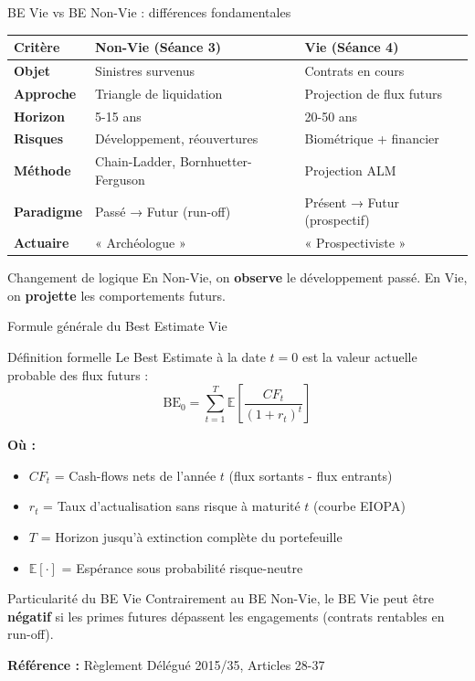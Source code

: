 \documentclass[10pt,aspectratio=169]{beamer}
\newcommand{\highlight}[1]{\textbf{\color{rougeactu}#1}}
\newcommand{\BE}{\text{BE}}
\begin{document}
\begin{frame}{BE Vie vs BE Non-Vie : différences fondamentales}
\begin{table}
\centering
\small
\begin{tabular}{l|p{5.5cm}|p{5.5cm}}
\toprule
\textbf{Critère} & \textbf{Non-Vie (Séance 3)} & \textbf{Vie (Séance 4)} \\
\midrule
\rowcolor{bleuactu!10}
\textbf{Objet} & Sinistres survenus & Contrats en cours \\
\textbf{Approche} & Triangle de liquidation & Projection de flux futurs \\
\rowcolor{bleuactu!10}
\textbf{Horizon} & 5-15 ans & 20-50 ans \\
\textbf{Risques} & Développement, réouvertures & Biométrique + financier \\
\rowcolor{bleuactu!10}
\textbf{Méthode} & Chain-Ladder, Bornhuetter-Ferguson & Projection ALM \\
\textbf{Paradigme} & Passé → Futur (run-off) & Présent → Futur (prospectif) \\
\rowcolor{bleuactu!10}
\textbf{Actuaire} & « Archéologue » & « Prospectiviste » \\
\bottomrule
\end{tabular}
\end{table}

\vspace{0.3cm}
\begin{exampleblock}{Changement de logique}
En Non-Vie, on \textbf{observe} le développement passé. En Vie, on \textbf{projette} les comportements futurs.
\end{exampleblock}
\end{frame}

\begin{frame}{Formule générale du Best Estimate Vie}
\begin{block}{Définition formelle}
Le Best Estimate à la date $t=0$ est la valeur actuelle probable des flux futurs :
\[
\boxed{\BE_0 = \sum_{t=1}^{T} \mathbb{E}\left[\frac{CF_t}{(1+r_t)^t}\right]}
\]
\end{block}

\textbf{Où :}
\begin{itemize}
    \item $CF_t$ = Cash-flows nets de l'année $t$ (flux sortants - flux entrants)
    \item $r_t$ = Taux d'actualisation sans risque à maturité $t$ (courbe EIOPA)
    \item $T$ = Horizon jusqu'à extinction complète du portefeuille
    \item $\mathbb{E}[\cdot]$ = Espérance sous probabilité risque-neutre
\end{itemize}

\vspace{0.3cm}
\begin{alertblock}{Particularité du BE Vie}
Contrairement au BE Non-Vie, le BE Vie peut être \highlight{négatif} si les primes futures dépassent les engagements (contrats rentables en run-off).
\end{alertblock}

\textbf{Référence :} Règlement Délégué 2015/35, Articles 28-37
\end{frame}
\end{document}
